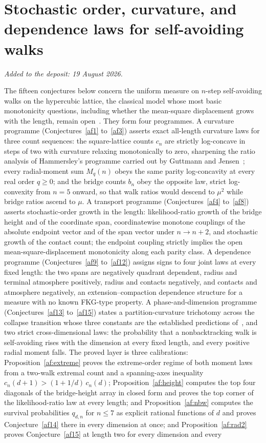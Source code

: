 \documentclass[11pt]{article}
\theoremstyle{definition}
\begin{document}
\part{Stochastic order, curvature, and dependence laws for self-avoiding walks}

\medskip\noindent\emph{Added to the deposit: 19 August 2026.}\par\medskip

The fifteen conjectures below concern the uniform measure on $n$-step self-avoiding walks on the hypercubic lattice, the classical model whose most basic monotonicity questions, including whether the mean-square displacement grows with the length, remain open~\cite{MS93,BDGS12}.  They form four programmes.  A curvature programme (Conjectures~\ref{af1} to~\ref{af3}) asserts exact all-length curvature laws for three count sequences: the square-lattice counts $c_n$ are strictly log-concave in steps of two with curvature relaxing monotonically to zero, sharpening the ratio analysis of Hammersley's programme carried out by Guttmann and Jensen~\cite{GJ22}; every radial-moment sum $M_q(n)$ obeys the same parity log-concavity at every real order $q\ge0$; and the bridge counts $b_n$ obey the opposite law, strict log-convexity from $n=5$ onward, so that walk ratios would descend to $\mu^2$ while bridge ratios ascend to $\mu$.  A transport programme (Conjectures~\ref{af4} to~\ref{af8}) asserts stochastic-order growth in the length: likelihood-ratio growth of the bridge height and of the coordinate span, coordinatewise monotone couplings of the absolute endpoint vector and of the span vector under $n\to n+2$, and stochastic growth of the contact count; the endpoint coupling strictly implies the open mean-square-displacement monotonicity along each parity class.  A dependence programme (Conjectures~\ref{af9} to~\ref{af12}) assigns signs to four joint laws at every fixed length: the two spans are negatively quadrant dependent, radius and terminal atmosphere positively, radius and contacts negatively, and contacts and atmosphere negatively, an extension--compaction dependence structure for a measure with no known FKG-type property.  A phase-and-dimension programme (Conjectures~\ref{af13} to~\ref{af15}) states a partition-curvature trichotomy across the collapse transition whose three constants are the established predictions of~\cite{Nie82,DS87,OPB93}, and two strict cross-dimensional laws: the probability that a nonbacktracking walk is self-avoiding rises with the dimension at every fixed length, and every positive radial moment falls.  The proved layer is three calibrations: Proposition~\ref{af:extreme} proves the extreme-order regime of both moment laws from a two-walk extremal count and a spanning-axes inequality $c_n(d+1)>(1+1/d)\,c_n(d)$; Proposition~\ref{af:height} computes the top four diagonals of the bridge-height array in closed form and proves the top corner of the likelihood-ratio law at every length; and Proposition~\ref{af:nbw} computes the survival probabilities $q_{d,n}$ for $n\le7$ as explicit rational functions of $d$ and proves Conjecture~\ref{af14} there in every dimension at once; and Proposition~\ref{af:rad2} proves Conjecture~\ref{af15} at length two for every dimension and every 
\end{document}
